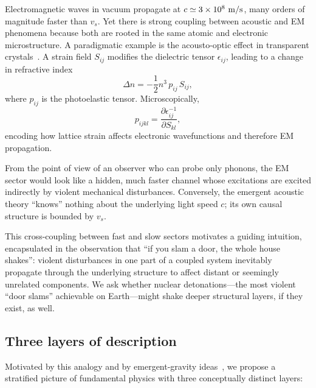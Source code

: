 \documentclass[aps,prd,twocolumn,nofootinbib,superscriptaddress]{revtex4-2}
\begin{document}
Electromagnetic waves in vacuum propagate at $c \simeq 3 \times 10^8~{\rm m/s}$, many orders of magnitude faster than $v_s$. Yet there is strong coupling between acoustic and EM phenomena because both are rooted in the same atomic and electronic microstructure. A paradigmatic example is the acousto-optic effect in transparent crystals~\cite{Brillouin1922,Yariv1984}. A strain field $S_{ij}$ modifies the dielectric tensor $\epsilon_{ij}$, leading to a change in refractive index
\begin{equation}
    \Delta n = -\frac{1}{2} n^3 \, p_{ij} \, S_{ij},
    \label{eq:acoustooptic}
\end{equation}
where $p_{ij}$ is the photoelastic tensor. Microscopically,
\begin{equation}
    p_{ijkl} = \frac{\partial \epsilon^{-1}_{ij}}{\partial S_{kl}},
\end{equation}
encoding how lattice strain affects electronic wavefunctions and therefore EM propagation.

From the point of view of an observer who can probe only phonons, the EM sector would look like a hidden, much faster channel whose excitations are excited indirectly by violent mechanical disturbances. Conversely, the emergent acoustic theory ``knows'' nothing about the underlying light speed $c$; its own causal structure is bounded by $v_s$.

This cross-coupling between fast and slow sectors motivates a guiding intuition, encapsulated in the observation that ``if you slam a door, the whole house shakes'':
violent disturbances in one part of a coupled system inevitably propagate through the underlying structure to affect distant or seemingly unrelated components.
 We ask whether nuclear detonations---the most violent ``door slams'' achievable on Earth---might shake deeper structural layers, if they exist, as well.

\subsection{Three layers of description}

Motivated by this analogy and by emergent-gravity ideas~\cite{VolovikBook,LiberatiReview,VisserAnalog}, we propose a stratified picture of fundamental physics with three conceptually distinct layers:
\end{document}
